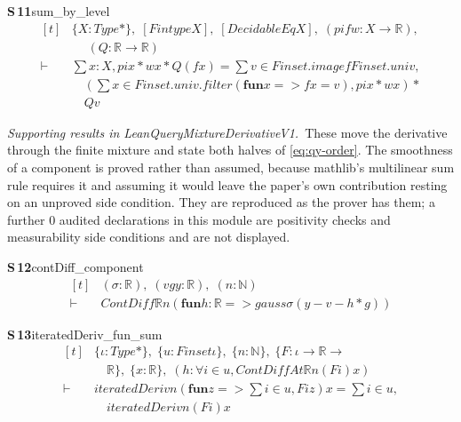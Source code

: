 \documentclass[conference]{IEEEtran}
\theoremstyle{definition}
\newcommand{\lean}[1]{\textsf{\footnotesize #1}}
\begin{document}
\noindent\textbf{S\,11}\quad\lean{sum\_by\_level}
{\footnotesize\[ \begin{aligned}[t]
&\{ \mathit{X} : \mathit{Type}*\},\; [\mathit{Fintype} \mathit{X}],\; [\mathit{DecidableEq} \mathit{X}],\; (\mathit{pi} \mathit{f} \mathit{w} : \mathit{X} \to \mathbb{R} ),\\
&\quad \; (\mathit{Q} : \mathbb{R} \to \mathbb{R} )\\
\vdash\;&\textstyle\sum \mathit{x} : \mathit{X}, \mathit{pi} \mathit{x} * \mathit{w} \mathit{x} * \mathit{Q} (\mathit{f} \mathit{x}) = \textstyle\sum \mathit{v} \in \mathit{Finset}.\mathit{image} \mathit{f} \mathit{Finset}.\mathit{univ},\\
&\quad (\textstyle\sum \mathit{x} \in \mathit{Finset}.\mathit{univ}.\mathit{filter} (\mathbf{fun} \mathit{x} => \mathit{f} \mathit{x} = \mathit{v}), \mathit{pi} \mathit{x} * \mathit{w} \mathit{x}) *\\
&\quad \mathit{Q} \mathit{v}
\end{aligned} \]}


\noindent\emph{Supporting results in \lean{LeanQueryMixtureDerivativeV1}.}~These move the derivative through the finite mixture and state both halves of \eqref{eq:qy-order}. The smoothness of a component is proved rather than assumed, because mathlib's multilinear sum rule requires it and assuming it would leave the paper's own contribution resting on an unproved side condition. They are reproduced as the prover has them; a further $0$ audited declarations in this module are positivity checks and measurability side conditions and are not displayed.

\noindent\textbf{S\,12}\quad\lean{contDiff\_component}
{\footnotesize\[ \begin{aligned}[t]
&(\sigma : \mathbb{R} ),\; (\mathit{v} \mathit{g} \mathit{y} : \mathbb{R} ),\; (\mathit{n} : \mathbb{N} )\\
\vdash\;&\mathit{ContDiff} \mathbb{R} \mathit{n} (\mathbf{fun} \mathit{h} : \mathbb{R} => \mathit{gauss} \sigma (\mathit{y} - \mathit{v} - \mathit{h} * \mathit{g}))
\end{aligned} \]}

\noindent\textbf{S\,13}\quad\lean{iteratedDeriv\_fun\_sum}
{\footnotesize\[ \begin{aligned}[t]
&\{ \iota : \mathit{Type}*\},\; \{ \mathit{u} : \mathit{Finset} \iota \},\; \{ \mathit{n} : \mathbb{N} \},\; \{ \mathit{F} : \iota \to \mathbb{R} \to\\
&\quad \mathbb{R} \},\; \{ \mathit{x} : \mathbb{R} \},\; (\mathit{h} : \forall \mathit{i} \in \mathit{u}, \mathit{ContDiffAt} \mathbb{R} \mathit{n} (\mathit{F} \mathit{i}) \mathit{x})\\
\vdash\;&\mathit{iteratedDeriv} \mathit{n} (\mathbf{fun} \mathit{z} => \textstyle\sum \mathit{i} \in \mathit{u}, \mathit{F} \mathit{i} \mathit{z}) \mathit{x} = \textstyle\sum \mathit{i} \in \mathit{u},\\
&\quad \mathit{iteratedDeriv} \mathit{n} (\mathit{F} \mathit{i}) \mathit{x}
\end{aligned} \]}
\end{document}
